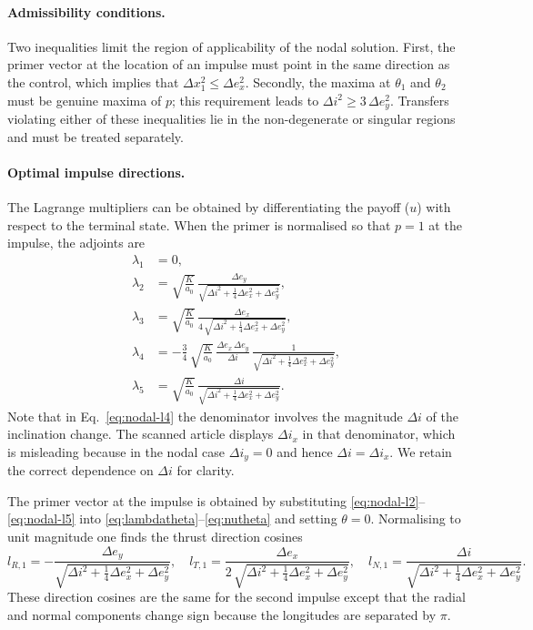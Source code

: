 \documentclass[12pt]{article}
\begin{document}
\paragraph{Admissibility conditions.}  Two inequalities limit the
region of applicability of the nodal solution.  First, the primer
vector at the location of an impulse must point in the same direction
as the control, which implies that $\Delta x_1^2 \leq \Delta e_x^2$.
Secondly, the maxima at $\theta_1$ and $\theta_2$ must be genuine
maxima of $p$; this requirement leads to $\Delta i^2 \geq 3\,\Delta
e_y^2$.  Transfers violating either of these inequalities lie in the
non-degenerate or singular regions and must be treated separately.

\paragraph{Optimal impulse directions.}  The Lagrange multipliers can
be obtained by differentiating the payoff ($u$) with respect to the
terminal state.  When the primer is normalised so that $p=1$ at the
impulse, the adjoints are
\begin{align}
  \lambda_1 &= 0,
    \tag{A8}\label{eq:nodal-l1}\\
  \lambda_2 &= \sqrt{\frac{K}{a_0}}\,\frac{\Delta e_y}{\sqrt{\Delta i^2 + \tfrac14\Delta e_x^2 + \Delta e_y^2}},
    \tag{A9}\label{eq:nodal-l2}\\
  \lambda_3 &= \sqrt{\frac{K}{a_0}}\,\frac{\Delta e_x}{4\,\sqrt{\Delta i^2 + \tfrac14\Delta e_x^2 + \Delta e_y^2}},
    \tag{A10}\label{eq:nodal-l3}\\
  \lambda_4 &= -\frac{3}{4}\,\sqrt{\frac{K}{a_0}}\,\frac{\Delta e_x\,\Delta e_y}{\Delta i}\,\frac{1}{\sqrt{\Delta i^2 + \tfrac14\Delta e_x^2 + \Delta e_y^2}},
    \tag{A11}\label{eq:nodal-l4}\\
  \lambda_5 &= \sqrt{\frac{K}{a_0}}\,\frac{\Delta i}{\sqrt{\Delta i^2 + \tfrac14\Delta e_x^2 + \Delta e_y^2}}.
    \tag{A12}\label{eq:nodal-l5}
\end{align}
Note that in Eq.~\eqref{eq:nodal-l4} the denominator involves the
magnitude $\Delta i$ of the inclination change.  The scanned
article displays $\Delta i_x$ in that denominator, which is
misleading because in the nodal case $\Delta i_y = 0$ and hence
$\Delta i = \Delta i_x$.  We retain the correct dependence on
$\Delta i$ for clarity.

The primer vector at the impulse is obtained by substituting
\eqref{eq:nodal-l2}--\eqref{eq:nodal-l5} into
\eqref{eq:lambdatheta}--\eqref{eq:nutheta} and setting $\theta=0$.
Normalising to unit magnitude one finds the thrust direction cosines
\begin{equation}
  l_{R,1} = -\frac{\Delta e_y}{\sqrt{\Delta i^2 + \tfrac14\Delta e_x^2 + \Delta e_y^2}},\quad
  l_{T,1} = \frac{\Delta e_x}{2\,\sqrt{\Delta i^2 + \tfrac14\Delta e_x^2 + \Delta e_y^2}},\quad
  l_{N,1} = \frac{\Delta i}{\sqrt{\Delta i^2 + \tfrac14\Delta e_x^2 + \Delta e_y^2}}.
  \tag{A13}\label{eq:nodal-dircos}
\end{equation}
These direction cosines are the same for the second impulse except
that the radial and normal components change sign because the
longitudes are separated by $\pi$.
\end{document}
